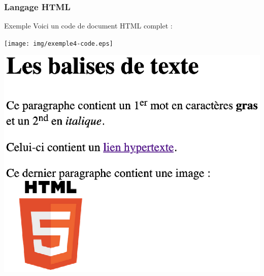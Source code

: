 \documentclass[8pt]{beamer}
\begin{document}
\begin{frame}
\frametitle{Langage HTML}

\begin{exampleblock}{Exemple}
Voici un code de document HTML complet :\medskip

\begin{minipage}{7.7cm}
\texttt{[image: img/exemple4-code.eps]}
\end{minipage}\hfill
\begin{minipage}{4.3cm}
\includegraphics[scale=0.34]{img/exemple4.eps}
\end{minipage}

\end{exampleblock}

\end{frame}
\end{document}
